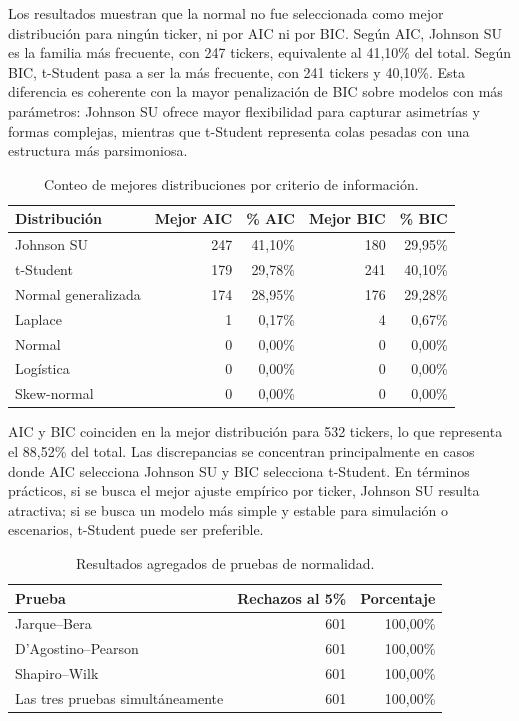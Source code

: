 Los resultados muestran que la normal no fue seleccionada como mejor distribuci\'on para ning\'un ticker, ni por AIC ni por BIC. Seg\'un AIC, Johnson SU es la familia m\'as frecuente, con 247 tickers, equivalente al 41,10\% del total. Seg\'un BIC, t-Student pasa a ser la m\'as frecuente, con 241 tickers y 40,10\%. Esta diferencia es coherente con la mayor penalizaci\'on de BIC sobre modelos con m\'as par\'ametros: Johnson SU ofrece mayor flexibilidad para capturar asimetr\'ias y formas complejas, mientras que t-Student representa colas pesadas con una estructura m\'as parsimoniosa.

\begin{table}[h]
\centering
\caption{Conteo de mejores distribuciones por criterio de informaci\'on.}
\label{tab:anexo4_mejores_distribuciones}
\small
\begin{tabular}{@{}lrrrr@{}}
\toprule
Distribuci\'on & Mejor AIC & \% AIC & Mejor BIC & \% BIC \\
\midrule
Johnson SU & 247 & 41,10\% & 180 & 29,95\% \\
t-Student & 179 & 29,78\% & 241 & 40,10\% \\
Normal generalizada & 174 & 28,95\% & 176 & 29,28\% \\
Laplace & 1 & 0,17\% & 4 & 0,67\% \\
Normal & 0 & 0,00\% & 0 & 0,00\% \\
Log\'istica & 0 & 0,00\% & 0 & 0,00\% \\
Skew-normal & 0 & 0,00\% & 0 & 0,00\% \\
\bottomrule
\end{tabular}
\end{table}

AIC y BIC coinciden en la mejor distribuci\'on para 532 tickers, lo que representa el 88,52\% del total. Las discrepancias se concentran principalmente en casos donde AIC selecciona Johnson SU y BIC selecciona t-Student. En t\'erminos pr\'acticos, si se busca el mejor ajuste emp\'irico por ticker, Johnson SU resulta atractiva; si se busca un modelo m\'as simple y estable para simulaci\'on o escenarios, t-Student puede ser preferible.

\begin{table}[h]
\centering
\caption{Resultados agregados de pruebas de normalidad.}
\label{tab:anexo4_normalidad}
\small
\begin{tabular}{@{}lrr@{}}
\toprule
Prueba & Rechazos al 5\% & Porcentaje \\
\midrule
Jarque--Bera & 601 & 100,00\% \\
D'Agostino--Pearson & 601 & 100,00\% \\
Shapiro--Wilk & 601 & 100,00\% \\
Las tres pruebas simult\'aneamente & 601 & 100,00\% \\
\bottomrule
\end{tabular}
\end{table}

